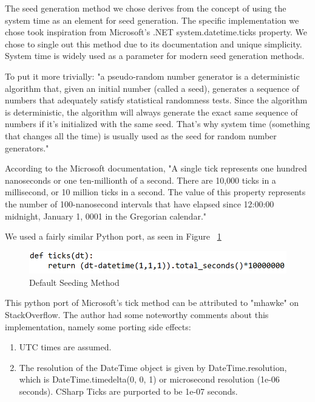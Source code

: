\documentclass[conference]{IEEEtran}
\begin{document}
The seed generation method we chose derives from the concept of using the system time as an element for seed generation. The specific implementation we chose took inspiration from Microsoft's .NET system.datetime.ticks property. \cite{msoftdocs} We chose to single out this method due to its documentation and unique simplicity. System time is widely used as a parameter for modern seed generation methods. 

To put it more trivially: "a pseudo-random number generator is a deterministic algorithm that, given an initial number (called a seed), generates a sequence of numbers that adequately satisfy statistical randomness tests. Since the algorithm is deterministic, the algorithm will always generate the exact same sequence of numbers if it's initialized with the same seed. That's why system time (something that changes all the time) is usually used as the seed for random number generators." \cite{pseudoquote}

According to the Microsoft documentation, "A single tick represents one hundred nanoseconds or one ten-millionth of a second. There are 10,000 ticks in a millisecond, or 10 million ticks in a second. The value of this property represents the number of 100-nanosecond intervals that have elapsed since 12:00:00 midnight, January 1, 0001 in the Gregorian calendar." \cite{msoftdocs}

We used a fairly similar Python port, as seen in Figure ~\ref{fig:Default Seeding Method}

\begin{figure}[H]
\centering
\includegraphics[width=1\linewidth]{./Images/Ticks.png}
\caption{Default Seeding Method}
\label{fig:Default Seeding Method}
\end{figure}

This python port of Microsoft's tick method can be attributed to "mhawke" on StackOverflow. \cite{tickport} The author had some noteworthy comments about this implementation, namely some porting side effects:
\begin{enumerate}
    \item UTC times are assumed.
    \item The resolution of the DateTime object is given by DateTime.resolution, which is DateTime.timedelta(0, 0, 1) or microsecond resolution (1e-06 seconds). CSharp Ticks are purported to be 1e-07 seconds.
\end{enumerate}
\end{document}
